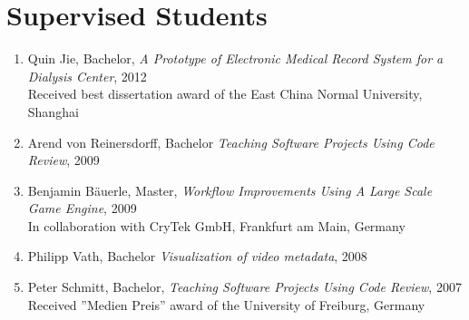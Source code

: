 \section{\sc Supervised Students}

\begin{enumerate}
  \item Quin Jie, Bachelor, \emph{A Prototype of Electronic Medical Record System for a Dialysis Center}, 2012\\
  Received best dissertation award of the East China Normal University, Shanghai 
      
  \item Arend von Reinersdorff, Bachelor \emph{Teaching Software Projects Using Code Review}, 2009
  
  \item Benjamin B\"auerle, Master, \emph{Workflow Improvements Using A Large Scale Game Engine}, 2009 \\
  In collaboration with CryTek GmbH, Frankfurt am Main, Germany
  
  \item Philipp Vath, Bachelor \emph{Visualization of video metadata}, 2008
  
  \item Peter Schmitt, Bachelor, \emph{Teaching Software Projects Using Code Review}, 2007 \\
  Received ''Medien Preis'' award of the University of Freiburg, Germany
  
\end{enumerate}

